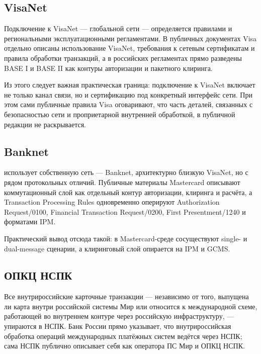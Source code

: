 \subsection*{VisaNet}

Подключение к VisaNet — глобальной сети  —
определяется правилами  и региональными
эксплуатационными регламентами. В публичных документах
Visa отдельно описаны использование VisaNet, требования
к сетевым сертификатам и правила обработки транзакций,
а в российских регламентах прямо разведены BASE I и BASE II
как контуры авторизации и пакетного клиринга.~\cite{visa-core-rules,visa-russia-operating-regs}

Из этого следует важная практическая граница: подключение
к VisaNet включает не только канал связи, но и сертификацию
под конкретный интерфейс сети. При этом сами
публичные правила Visa оговаривают, что часть деталей,
связанных с безопасностью сети и проприетарной внутренней
обработкой,
в публичной редакции не раскрывается.~\cite{visa-core-rules}

\subsection*{Banknet}

 использует собственную сеть — Banknet,
архитектурно близкую VisaNet, но с рядом протокольных
отличий. Публичные материалы Mastercard описывают
коммутационный слой как отдельный контур авторизации,
клиринга и расчёта, а Transaction Processing Rules
одновременно оперируют Authorization Request/0100,
Financial Transaction Request/0200, First Presentment/1240
и форматами IPM.~\cite{mc-switching-services,mc-tpr}

Практический вывод отсюда такой: в Mastercard-среде
сосуществуют single- и dual-message сценарии, а клиринговый
слой опирается на IPM и GCMS.~\cite{mc-switching-services,mc-tpr}

\subsection*{ОПКЦ НСПК}

Все внутрироссийские карточные транзакции — независимо
от того, выпущена ли карта внутри российской системы Мир
или относится к международной схеме, работающей во внутреннем
контуре через российскую инфраструктуру, — упираются
в НСПК. Банк России прямо указывает, что внутрироссийская
обработка операций международных платёжных систем ведётся
через НСПК; сама НСПК публично описывает себя как оператора
ПС Мир и ОПКЦ НСПК.~\cite{cbr-national-payment-system,nspk-about-company}

